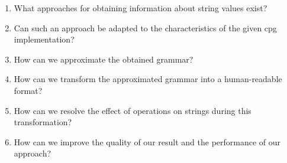 \begin{enumerate}[noitemsep]
	\item What approaches for obtaining information about string values exist?
	\item Can such an approach be adapted to the characteristics of the given \ac{cpg} implementation?
	\item How can we approximate the obtained grammar?
	\item How can we transform the approximated grammar into a human-readable format?
	\item How can we resolve the effect of operations on strings during this transformation?
	\item How can we improve the quality of our result and the performance of our approach?
\end{enumerate}

\begin{comment}
	
The introduction is a bit like a teaser. Here, you dig more into details, also
technical ones. After this chapter, the reader must understand why you do this
work, why it's important, what makes it difficult and what you want to achieve.

\begin{itemize}
\item What's the problem that you're trying to solve?
\item What is your goal?
\item What is/are the research question(s)?
\item What are special problems?
\end{itemize}

Probably 1-3 pages

\end{comment}
